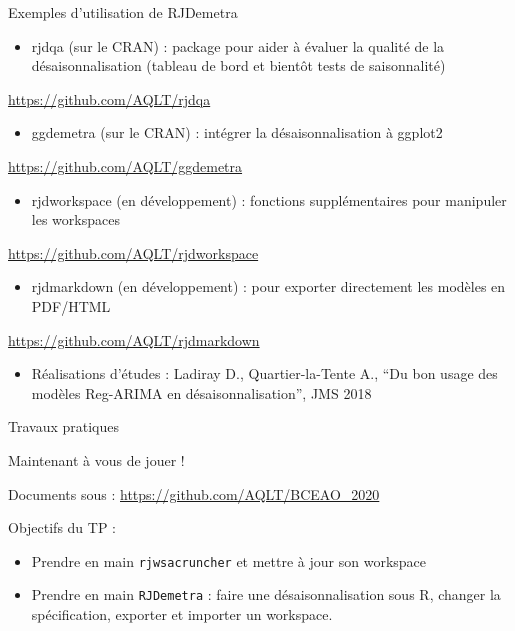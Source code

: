 \documentclass[10pt,xcolor=table,color={dvipsnames,usenames},ignorenonframetext,usepdftitle=false,french]{beamer}
\providecommand{\tightlist}{%
  \setlength{\parskip}{0pt}
  }
\begin{document}
\begin{frame}{Exemples d'utilisation de RJDemetra}
\protect\hypertarget{exemples-dutilisation-de-rjdemetra}{}

\begin{itemize}
\tightlist
\item
  rjdqa (sur le CRAN) : package pour aider à évaluer la qualité de la
  désaisonnalisation (tableau de bord et bientôt tests de saisonnalité)
\end{itemize}

\faGithub{} \url{https://github.com/AQLT/rjdqa}

\begin{itemize}
\tightlist
\item
  ggdemetra (sur le CRAN) : intégrer la désaisonnalisation à ggplot2
\end{itemize}

\faGithub{} \url{https://github.com/AQLT/ggdemetra}

\begin{itemize}
\tightlist
\item
  rjdworkspace (en développement) : fonctions supplémentaires pour
  manipuler les workspaces
\end{itemize}

\faGithub{} \url{https://github.com/AQLT/rjdworkspace}

\begin{itemize}
\tightlist
\item
  rjdmarkdown (en développement) : pour exporter directement les modèles
  en PDF/HTML
\end{itemize}

\faGithub{} \url{https://github.com/AQLT/rjdmarkdown}

\begin{itemize}
\tightlist
\item
  Réalisations d'études : Ladiray D., Quartier-la-Tente A., ``Du bon
  usage des modèles Reg-ARIMA en désaisonnalisation'', JMS 2018
\end{itemize}

\end{frame}

\begin{frame}[fragile]{Travaux pratiques \bcoutil}
\protect\hypertarget{travaux-pratiques}{}

Maintenant à vous de jouer !

Documents sous : \url{https://github.com/AQLT/BCEAO_2020}

Objectifs du TP :

\begin{itemize}
\item
  Prendre en main \texttt{rjwsacruncher} et mettre à jour son workspace
\item
  Prendre en main \texttt{RJDemetra} : faire une désaisonnalisation sous
  R, changer la spécification, exporter et importer un workspace.
\end{itemize}

\end{frame}
\end{document}
